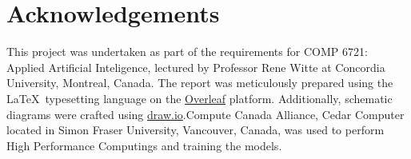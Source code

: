 \documentclass[]{report}
\begin{document}
\chapter*{Acknowledgements}

This project was undertaken as part of the requirements for COMP 6721: Applied Artificial Inteligence, lectured by Professor Rene Witte at Concordia University, Montreal, Canada. The report was meticulously prepared using the \LaTeX\ typesetting language on the \href{https://www.overleaf.com/}{Overleaf} platform. Additionally, schematic diagrams were crafted using \href{https://app.diagrams.net/}{draw.io}.Compute Canada Alliance, Cedar Computer located in Simon Fraser University, Vancouver, Canada, was used to perform High Performance Computings and training the models.


 
\end{document}
